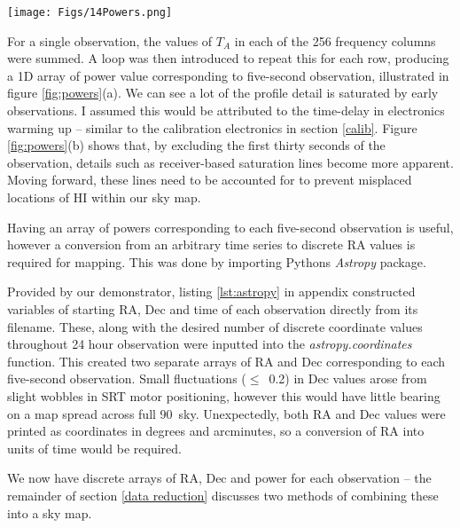 \documentclass[11pt]{article} %
\begin{document}

\begin{figure*}[t!]
\centering
\texttt{[image: Figs/14Powers.png]}
\caption{Plots of integrated power arrays. a) Original array –- details saturated by first elements. b) Chopped array –- more detail but saturation lines present. c) Quantised array –- 360 Power values.}
\label{fig:powers}
\end{figure*}

%

For a single observation, the values of $T_{A}$ in each of the 256 frequency columns were summed. A loop was then introduced to repeat this for each row, producing a 1D array of power value corresponding to five-second observation, illustrated in figure \ref{fig:powers}(a). We can see a lot of the profile detail is saturated by early observations. I assumed this would be attributed to the time-delay in electronics warming up -- similar to the calibration electronics in section \ref{calib}. Figure \ref{fig:powers}(b) shows that, by excluding the first thirty seconds of the observation, details such as receiver-based saturation lines become more apparent. Moving forward, these lines need to be accounted for to prevent misplaced locations of HI within our sky map.

Having an array of powers corresponding to each five-second observation is useful, however a conversion from an arbitrary time series to discrete RA values is required for mapping. This was done by importing Python\textquotesingle s \textit{Astropy} package. 

Provided by our demonstrator, listing \ref{lst:astropy} in appendix constructed variables of starting RA, Dec and time of each observation directly from its filename. These, along with the desired number of discrete coordinate values throughout 24 hour observation were inputted into the \textit{astropy.coordinates} function. This created two separate arrays of RA and Dec corresponding to each five-second observation. Small fluctuations ($\leq$~0.2\degree) in Dec values arose from slight wobbles in SRT motor positioning, however this would have little bearing on a map spread across full 90\degree~sky. Unexpectedly, both RA and Dec values were printed as coordinates in degrees and arcminutes, so a conversion of RA into units of time would be required. 

We now have discrete arrays of RA, Dec and power for each observation -- the remainder of section \ref{data reduction} discusses two methods of combining these into a sky map.
\end{document}
